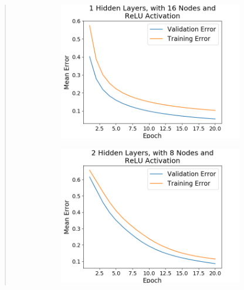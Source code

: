 \documentclass{article}
\begin{document}
\begin{quote}
\begin{figure}[h]
\begin{subfigure}[h]{0.23\textwidth}
	\includegraphics[width=\textwidth]{figs/Cancer_Binary_Classification_1_Hidden_Layers_with_16_Nodes_and_ReLU_Activation.png}
\end{subfigure}
%
\begin{subfigure}[h]{0.23\textwidth}
	\includegraphics[width=\textwidth]{figs/Cancer_Binary_Classification_2_Hidden_Layers_with_8_Nodes_and_ReLU_Activation.png}
\end{subfigure}
%
\begin{subfigure}[h]{0.23\textwidth}

\end{subfigure}
\end{figure}
\end{quote}
\end{document}
